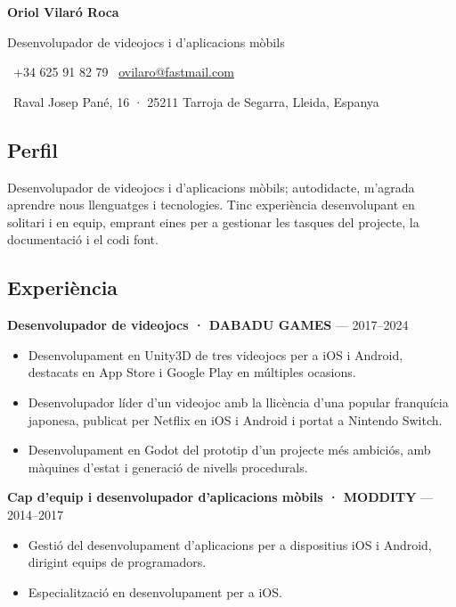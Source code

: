 \documentclass[
  11pt,
  a4paper]{article}
\author{}
\date{}
\providecommand{\tightlist}{%
  \setlength{\itemsep}{0pt}\setlength{\parskip}{0pt}}
\begin{document}
\begin{center}
{\Huge\bfseries\color{accent} Oriol Vilaró Roca\par}
\vspace{2pt}
{\large Desenvolupador de videojocs i d'aplicacions mòbils\par}
\vspace{6pt}
{\small
{}\ +34 625 91 82 79 \quad
{}\ \href{mailto:ovilaro@fastmail.com}{ovilaro@fastmail.com}\par
{}\ Raval Josep Pané, 16 · 25211 Tarroja de Segarra, Lleida, Espanya\par}
\end{center}
\vspace{8pt}

\subsection{Perfil}\label{perfil}

Desenvolupador de videojocs i d'aplicacions mòbils; autodidacte,
m'agrada aprendre nous llenguatges i tecnologies. Tinc experiència
desenvolupant en solitari i en equip, emprant eines per a gestionar les
tasques del projecte, la documentació i el codi font.

\subsection{Experiència}\label{experiuxe8ncia}

\textbf{Desenvolupador de videojocs · DABADU GAMES} --- 2017--2024

\begin{itemize}
\tightlist
\item
  Desenvolupament en Unity3D de tres videojocs per a iOS i Android,
  destacats en App Store i Google Play en múltiples ocasions.
\item
  Desenvolupador líder d'un videojoc amb la llicència d'una popular
  franquícia japonesa, publicat per Netflix en iOS i Android i portat a
  Nintendo Switch.
\item
  Desenvolupament en Godot del prototip d'un projecte més ambiciós, amb
  màquines d'estat i generació de nivells procedurals.
\end{itemize}

\textbf{Cap d'equip i desenvolupador d'aplicacions mòbils · MODDITY} ---
2014--2017

\begin{itemize}
\tightlist
\item
  Gestió del desenvolupament d'aplicacions per a dispositius iOS i
  Android, dirigint equips de programadors.
\item
  Especialització en desenvolupament per a iOS.
\end{itemize}
\end{document}
